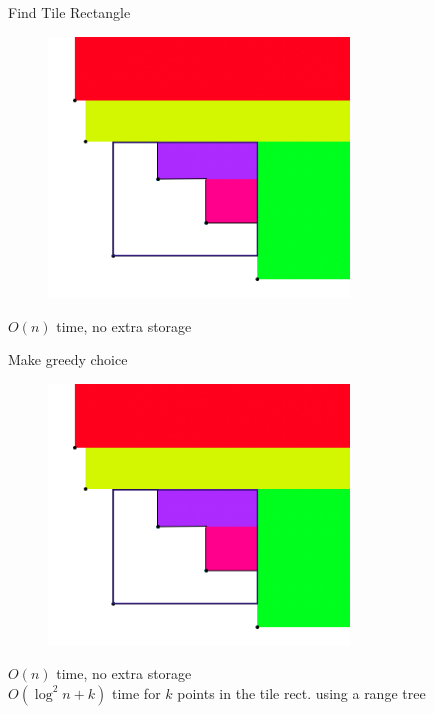 \documentclass[11pt, british]{beamer}
\begin{document}
\begin{frame}{Find Tile Rectangle}
  \begin{figure}
    \centering
    \includegraphics[width=8cm]{tile rectangle.png}
  \end{figure}

  $O(n)$ time, no extra storage
\end{frame}

\begin{frame}{Make greedy choice}
  \begin{figure}
    \centering
    \includegraphics[width=8cm]{tile rectangle.png}
  \end{figure}

  $O(n)$ time, no extra storage \\
  $O(\log^2 n + k)$ time for $k$ points in the tile rect. using a range tree
\end{frame}
\end{document}
